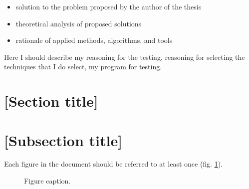 \begin{itemize}
\item solution to the problem proposed by the author of the thesis
\item theoretical analysis of proposed solutions
\item rationale of applied methods, algorithms, and tools
\end{itemize}

Here I should describe my reasoning for the testing, reasoning for
selecting the techniques that I do select, my program for testing.

\section{[Section title]}

\section{[Subsection title]}

Each figure in the document should be referred to at least once (fig. \ref{fig:2}).

\begin{figure}
\centering
{}
\caption{Figure caption.} %
\label{fig:2}
\end{figure}


